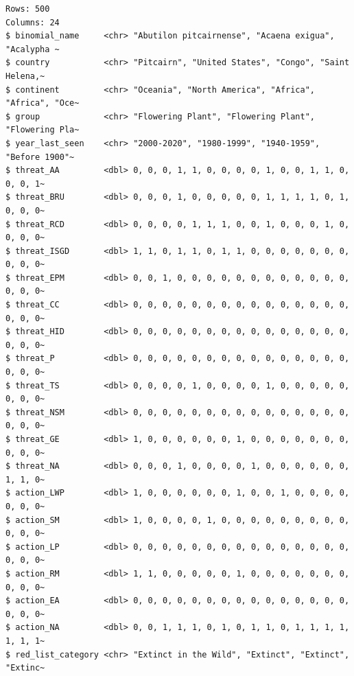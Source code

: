 \documentclass[
  letterpaper,
]{book}
\begin{document}
\begin{verbatim}
Rows: 500
Columns: 24
$ binomial_name     <chr> "Abutilon pitcairnense", "Acaena exigua", "Acalypha ~
$ country           <chr> "Pitcairn", "United States", "Congo", "Saint Helena,~
$ continent         <chr> "Oceania", "North America", "Africa", "Africa", "Oce~
$ group             <chr> "Flowering Plant", "Flowering Plant", "Flowering Pla~
$ year_last_seen    <chr> "2000-2020", "1980-1999", "1940-1959", "Before 1900"~
$ threat_AA         <dbl> 0, 0, 0, 1, 1, 0, 0, 0, 0, 1, 0, 0, 1, 1, 0, 0, 0, 1~
$ threat_BRU        <dbl> 0, 0, 0, 1, 0, 0, 0, 0, 0, 1, 1, 1, 1, 0, 1, 0, 0, 0~
$ threat_RCD        <dbl> 0, 0, 0, 0, 1, 1, 1, 0, 0, 1, 0, 0, 0, 1, 0, 0, 0, 0~
$ threat_ISGD       <dbl> 1, 1, 0, 1, 1, 0, 1, 1, 0, 0, 0, 0, 0, 0, 0, 0, 0, 0~
$ threat_EPM        <dbl> 0, 0, 1, 0, 0, 0, 0, 0, 0, 0, 0, 0, 0, 0, 0, 0, 0, 0~
$ threat_CC         <dbl> 0, 0, 0, 0, 0, 0, 0, 0, 0, 0, 0, 0, 0, 0, 0, 0, 0, 0~
$ threat_HID        <dbl> 0, 0, 0, 0, 0, 0, 0, 0, 0, 0, 0, 0, 0, 0, 0, 0, 0, 0~
$ threat_P          <dbl> 0, 0, 0, 0, 0, 0, 0, 0, 0, 0, 0, 0, 0, 0, 0, 0, 0, 0~
$ threat_TS         <dbl> 0, 0, 0, 0, 1, 0, 0, 0, 0, 1, 0, 0, 0, 0, 0, 0, 0, 0~
$ threat_NSM        <dbl> 0, 0, 0, 0, 0, 0, 0, 0, 0, 0, 0, 0, 0, 0, 0, 0, 0, 0~
$ threat_GE         <dbl> 1, 0, 0, 0, 0, 0, 0, 1, 0, 0, 0, 0, 0, 0, 0, 0, 0, 0~
$ threat_NA         <dbl> 0, 0, 0, 1, 0, 0, 0, 0, 1, 0, 0, 0, 0, 0, 0, 1, 1, 0~
$ action_LWP        <dbl> 1, 0, 0, 0, 0, 0, 0, 1, 0, 0, 1, 0, 0, 0, 0, 0, 0, 0~
$ action_SM         <dbl> 1, 0, 0, 0, 0, 1, 0, 0, 0, 0, 0, 0, 0, 0, 0, 0, 0, 0~
$ action_LP         <dbl> 0, 0, 0, 0, 0, 0, 0, 0, 0, 0, 0, 0, 0, 0, 0, 0, 0, 0~
$ action_RM         <dbl> 1, 1, 0, 0, 0, 0, 0, 1, 0, 0, 0, 0, 0, 0, 0, 0, 0, 0~
$ action_EA         <dbl> 0, 0, 0, 0, 0, 0, 0, 0, 0, 0, 0, 0, 0, 0, 0, 0, 0, 0~
$ action_NA         <dbl> 0, 0, 1, 1, 1, 0, 1, 0, 1, 1, 0, 1, 1, 1, 1, 1, 1, 1~
$ red_list_category <chr> "Extinct in the Wild", "Extinct", "Extinct", "Extinc~
\end{verbatim}
\end{document}
